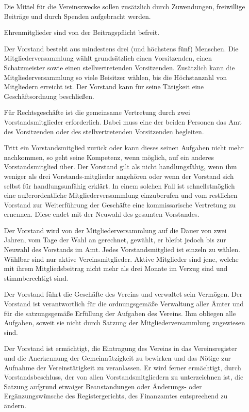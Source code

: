 \documentclass[parskip]{scrartcl}
\begin{document}
\begin{contract}
Die Mittel für die Vereinszwecke sollen zusätzlich durch Zuwendungen, freiwillige Beiträge und durch Spenden aufgebracht werden.

Ehrenmitglieder sind von der Beitragspflicht befreit.


Der Vorstand besteht aus mindestens drei (und höchstens fünf) Menschen. Die Mitgliederversammlung wählt grundsätzlich einen Vorsitzenden, einen Schatzmeister sowie einen stellvertretenden Vorsitzenden. Zusätzlich kann die Mitgliederversammlung so viele Beisitzer wählen, bis die Höchstanzahl von Mitgliedern erreicht ist. Der Vorstand kann für seine Tätigkeit eine Geschäftsordnung beschließen.

Für Rechtsgeschäfte ist die gemeinsame Vertretung durch zwei Vorstandsmitglieder erforderlich. Dabei muss eine der beiden Personen das Amt des Vorsitzenden oder des stellvertretenden Vorsitzenden begleiten.

Tritt ein Vorstandsmitglied zurück oder kann dieses seinen Aufgaben nicht mehr nachkommen, so geht seine Kompetenz, wenn möglich, auf ein anderes Vorstandsmitglied über. Der Vorstand gilt als nicht handlungsfähig, wenn ihm weniger als drei Vorstands-mitglieder angehören oder wenn der Vorstand sich selbst für handlungsunfähig erklärt. In einem solchen Fall ist schnellstmöglich eine außerordentliche Mitgliederversammlung einzuberufen und vom restlichen Vorstand zur Weiterführung der Geschäfte eine kommissarische Vertretung zu ernennen. Diese endet mit der Neuwahl des gesamten Vorstandes.


Der Vorstand wird von der Mitgliederversammlung auf die Dauer von zwei Jahren, vom Tage der Wahl an gerechnet, gewählt, er bleibt jedoch bis zur Neuwahl des Vorstands im Amt. Jedes Vorstandsmitglied ist einzeln zu wählen. Wählbar sind nur aktive Vereinsmitglieder. Aktive Mitglieder sind jene, welche mit ihrem Mitgliedsbeitrag nicht mehr als drei Monate im Verzug sind und stimmberechtigt sind.

Der Vorstand führt die Geschäfte des Vereins und verwaltet sein Vermögen. Der Vorstand ist verantwortlich für die ordnungsgemäße Verwaltung aller Ämter und für die satzungsgemäße Erfüllung der Aufgaben des Vereins. Ihm obliegen alle Aufgaben, soweit sie nicht durch Satzung der Mitgliederversammlung zugewiesen sind.

Der Vorstand ist ermächtigt, die Eintragung des Vereins in das Vereinsregister und die Anerkennung der Gemeinnützigkeit zu bewirken und das Nötige zur Aufnahme der Vereinstätigkeit zu veranlassen. Er wird ferner ermächtigt, durch Vorstandsbeschluss, der von allen Vorstandsmitgliedern zu unterzeichnen ist, die Satzung aufgrund etwaiger Beanstandungen oder Änderungs- oder Ergänzungswünsche des Registergerichts, des Finanzamtes entsprechend zu ändern.


\end{contract}
\end{document}
